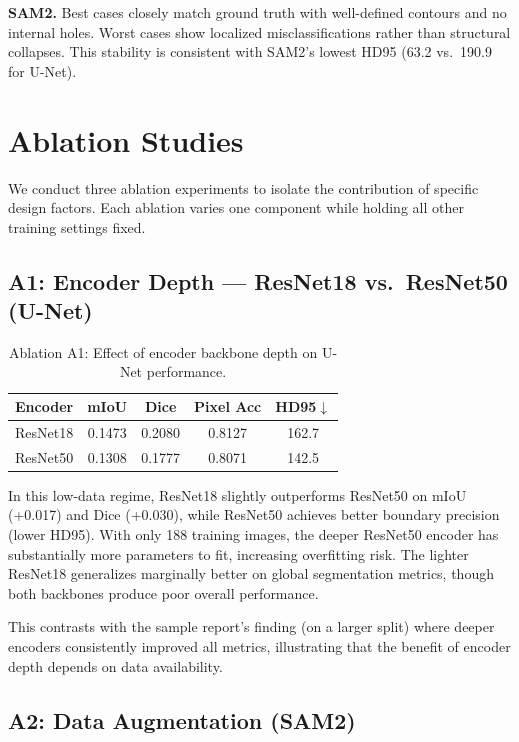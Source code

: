 \documentclass[11pt]{article}
\begin{document}
\textbf{SAM2.} Best cases closely match ground truth with well-defined contours and no internal holes. Worst cases show localized misclassifications rather than structural collapses. This stability is consistent with SAM2's lowest HD95 (63.2 vs.\ 190.9 for U-Net).

\section{Ablation Studies}

We conduct three ablation experiments to isolate the contribution of specific design factors. Each ablation varies one component while holding all other training settings fixed.

\subsection{A1: Encoder Depth --- ResNet18 vs.\ ResNet50 (U-Net)}

\begin{table}[H]
\centering
\caption{Ablation A1: Effect of encoder backbone depth on U-Net performance.}
\label{tab:abl_depth}
\begin{tabular}{lcccc}
\toprule
Encoder & mIoU & Dice & Pixel Acc & HD95$\downarrow$ \\
\midrule
ResNet18 & 0.1473 & 0.2080 & 0.8127 & 162.7 \\
ResNet50 & 0.1308 & 0.1777 & 0.8071 & 142.5 \\
\bottomrule
\end{tabular}
\end{table}

In this low-data regime, ResNet18 slightly outperforms ResNet50 on mIoU (+0.017) and Dice (+0.030), while ResNet50 achieves better boundary precision (lower HD95). With only 188 training images, the deeper ResNet50 encoder has substantially more parameters to fit, increasing overfitting risk. The lighter ResNet18 generalizes marginally better on global segmentation metrics, though both backbones produce poor overall performance.

This contrasts with the sample report's finding (on a larger split) where deeper encoders consistently improved all metrics, illustrating that the benefit of encoder depth depends on data availability.

\subsection{A2: Data Augmentation (SAM2)}
\end{document}
